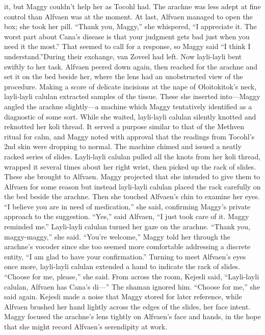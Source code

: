 \documentclass[9pt]{article}
\begin{document}
it, but Maggy couldn’t help her as Tocohl had. The arachne was less adept at fine control than Alfvaen
was at the moment. At last, Alfvaen managed to open the box; she took her pill. “Thank you, Maggy,”
she whispered, “I appreciate it. The worst part about Cana’s disease is that your judgment gets bad just
when you need it the most.”
That seemed to call for a response, so Maggy said “I think I understand.”During their exchange, van Zoveel had left. Now layli-layli bent swiftly to her task.
Alfvaen peered down again, then reached for the arachne and set it on the bed beside her, where the
lens had an unobstructed view of the procedure.
Making a score of delicate incisions at the nape of Oloitokitok’s neck, layli-layli calulan extracted
samples of the tissue. These she inserted into—Maggy angled the arachne slightly—a machine which
Maggy tentatively identified as a diagnostic of some sort.
While she waited, layli-layli calulan silently knotted and reknotted her koli thread. It served a
purpose similar to that of the Methven ritual for calm, and Maggy noted with approval that the readings
from Tocohl’s 2nd skin were dropping to normal.
The machine chimed and issued a neatly racked series of slides. Layli-layli calulan pulled all the
knots from her koli thread, wrapped it several times about her right wrist, then picked up the rack of
slides. These she brought to Alfvaen.
Maggy projected that she intended to give them to Alfvaen for some reason but instead layli-layli
calulan placed the rack carefully on the bed beside the arachne. Then she touched Alfvaen’s chin to
examine her eyes. “I believe you are in need of medication,” she said, confirming Maggy’s private
approach to the suggestion.
“Yes,” said Alfvaen, “I just took care of it. Maggy reminded me.”
Layli-layli calulan turned her gaze on the arachne. “Thank you, maggy-maggy,” she said.
“You’re welcome,” Maggy told her through the arachne’s vocoder since she too seemed more
comfortable addressing a discrete entity, “I am glad to have your confirmation.”
Turning to meet Alfvaen’s eyes once more, layli-layli calulan extended a hand to indicate the rack
of slides. “Choose for me, please,” she said.
From across the room, Kejesli said, “Layli-layli calulan, Alfvaen has Cana’s di—”
The shaman ignored him. “Choose for me,” she said again.
Kejesli made a noise that Maggy stored for later reference, while Alfvaen brushed her hand lightly
across the edges of the slides, her face intent. Maggy focused the arachne’s lens tightly on Alfvaen’s face
and hands, in the hope that she might record Alfvaen’s serendipity at work.
\end{document}
